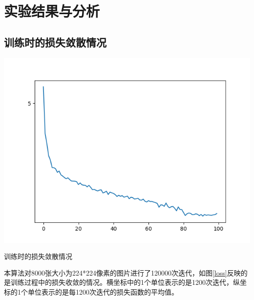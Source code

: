 \section{实验结果与分析}
\setcounter{figure}{0}
\subsection{训练时的损失敛散情况}
\begin{uscfigure}
	\includegraphics[width=\textwidth]{./Pictures/loss.png}	
	\caption{训练时的损失敛散情况}
	\label{loss}
\end{uscfigure}

本算法对8000张大小为224*224像素的图片进行了120000次迭代，如图\ref{loss}反映的是训练过程中的损失收敛的情况。横坐标中的1个单位表示的是1200次迭代，纵坐标的1个单位表示的是每1200次迭代的损失函数的平均值。
